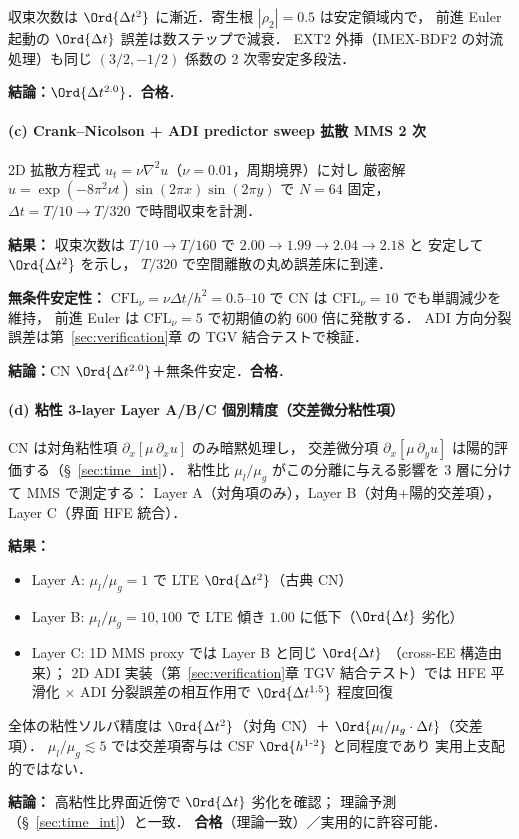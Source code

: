 収束次数は $\Ord{\Delta t^2}$ に漸近．寄生根 $|\rho_2| = 0.5$ は安定領域内で，
前進 Euler 起動の $\Ord{\Delta t}$ 誤差は数ステップで減衰．
EXT2 外挿（IMEX-BDF2 の対流処理）も同じ $(3/2, -1/2)$ 係数の 2 次零安定多段法．

\noindent\textbf{結論：}$\Ord{\Delta t^{2.0}}$．\textbf{合格}．

\paragraph{(c) Crank--Nicolson + ADI predictor sweep 拡散 MMS 2 次}
\label{sec:verify_cn_viscous}

2D 拡散方程式 $u_t = \nu \nabla^2 u$（$\nu = 0.01$，周期境界）に対し
厳密解 $u = \exp(-8\pi^2 \nu t)\sin(2\pi x)\sin(2\pi y)$ で $N = 64$ 固定，
$\Delta t = T/10 \to T/320$ で時間収束を計測．

\noindent\textbf{結果：}
収束次数は $T/10 \to T/160$ で $2.00 \to 1.99 \to 2.04 \to 2.18$ と
安定して $\Ord{\Delta t^2}$ を示し，
$T/320$ で空間離散の丸め誤差床に到達．

\noindent\textbf{無条件安定性：}
$\mathrm{CFL}_\nu = \nu\Delta t/h^2 = 0.5$--$10$ で
CN は $\mathrm{CFL}_\nu = 10$ でも単調減少を維持，
前進 Euler は $\mathrm{CFL}_\nu = 5$ で初期値の約 $600$ 倍に発散する．
ADI 方向分裂誤差は第~\ref{sec:verification}章 の TGV 結合テストで検証．

\noindent\textbf{結論：}CN $\Ord{\Delta t^{2.0}}$＋無条件安定．\textbf{合格}．

\paragraph{(d) 粘性 3-layer Layer A/B/C 個別精度（交差微分粘性項）}
\label{sec:verify_cross_viscous}

CN は対角粘性項 $\partial_x[\mu\,\partial_x u]$ のみ暗黙処理し，
交差微分項 $\partial_x[\mu\,\partial_y u]$ は陽的評価する（§~\ref{sec:time_int}）．
粘性比 $\mu_l/\mu_g$ がこの分離に与える影響を 3 層に分けて MMS で測定する：
Layer A（対角項のみ），Layer B（対角+陽的交差項），Layer C（界面 HFE 統合）．

\noindent\textbf{結果：}
\begin{itemize}[noitemsep]
  \item Layer A: $\mu_l/\mu_g = 1$ で LTE $\Ord{\Delta t^2}$（古典 CN）
  \item Layer B: $\mu_l/\mu_g = 10, 100$ で LTE 傾き $1.00$ に低下（$\Ord{\Delta t}$ 劣化）
  \item Layer C: 1D MMS proxy では Layer B と同じ $\Ord{\Delta t}$
        （cross-EE 構造由来）；
        2D ADI 実装（第~\ref{sec:verification}章 TGV 結合テスト）では
        HFE 平滑化 $\times$ ADI 分裂誤差の相互作用で
        $\Ord{\Delta t^{1.5}}$ 程度回復
\end{itemize}
全体の粘性ソルバ精度は
$\Ord{\Delta t^2}$（対角 CN）＋ $\Ord{\mu_l/\mu_g \cdot \Delta t}$（交差項）．
$\mu_l/\mu_g \lesssim 5$ では交差項寄与は CSF $\Ord{h^{1\text{-}2}}$ と同程度であり
実用上支配的ではない．

\noindent\textbf{結論：}
高粘性比界面近傍で $\Ord{\Delta t}$ 劣化を確認；
理論予測（§~\ref{sec:time_int}）と一致．
\textbf{合格}（理論一致）／実用的に許容可能．
